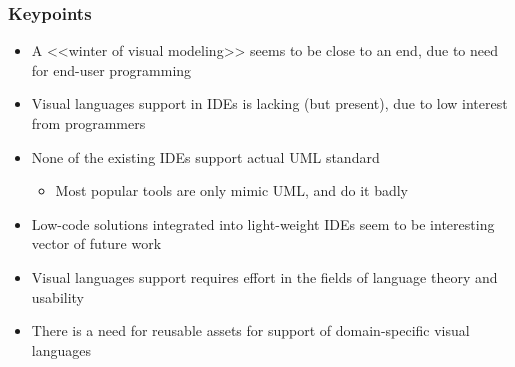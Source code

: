 \documentclass{slides-style}
\begin{document}
    \begin{frame}
        \frametitle{Keypoints}
        \begin{itemize}
            \item A <<winter of visual modeling>> seems to be close to an end, due to need for end-user programming
            \item Visual languages support in IDEs is lacking (but present), due to low interest from programmers
            \item None of the existing IDEs support actual UML standard
            \begin{itemize}
                \item Most popular tools are only mimic UML, and do it badly
            \end{itemize}
            \item Low-code solutions integrated into light-weight IDEs seem to be interesting vector of future work
            \item Visual languages support requires effort in the fields of language theory and usability
            \item There is a need for reusable assets for support of domain-specific visual languages
        \end{itemize}
    \end{frame}
\end{document}
